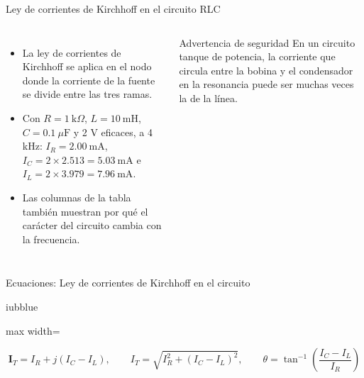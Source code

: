 \documentclass[aspectratio=169,11pt,xcolor={table}]{beamer}
\begin{document}
\begin{frame}{Ley de corrientes de Kirchhoff en el circuito RLC}
\begin{columns}[c,onlytextwidth]
\small
\begin{itemize}\setlength{\itemsep}{4pt}
  \item La ley de corrientes de Kirchhoff se aplica en el nodo donde la corriente de la fuente se divide entre las tres ramas.
  \item Con $R = 1\ \text{k}\Omega$, $L = 10\ \text{mH}$, $C = 0.1\ \mu\text{F}$ y 2 V eficaces, a 4 kHz: $I_R = 2.00\ \text{mA}$, $I_C = 2 \times 2.513 = 5.03\ \text{mA}$ e $I_L = 2 \times 3.979 = 7.96\ \text{mA}$.
  \item Las columnas de la tabla también muestran por qué el carácter del circuito cambia con la frecuencia.
\end{itemize}
\begin{cardO}{Advertencia de seguridad}
\footnotesize En un circuito tanque de potencia, la corriente que circula entre la bobina y el condensador en la resonancia puede ser muchas veces la de la línea.
\end{cardO}
\end{columns}
\end{frame}

\begin{frame}{{\normalsize Ecuaciones: Ley de corrientes de Kirchhoff en el circuito}}
\begin{cajaplana}{iubblue}
\centering
\begin{adjustbox}{max width=\linewidth}
\begin{minipage}{1.50\linewidth}
{\large
\begin{equation*}
  \mathbf{I}_T = I_R + j(I_C - I_L), \qquad I_T = \sqrt{I_R^{2} + (I_C - I_L)^{2}}, \qquad \theta = \tan^{-1}\!\left(\frac{I_C - I_L}{I_R}\right)
\end{equation*}
}
\end{minipage}
\end{adjustbox}
\end{cajaplana}
\end{frame}
\end{document}
